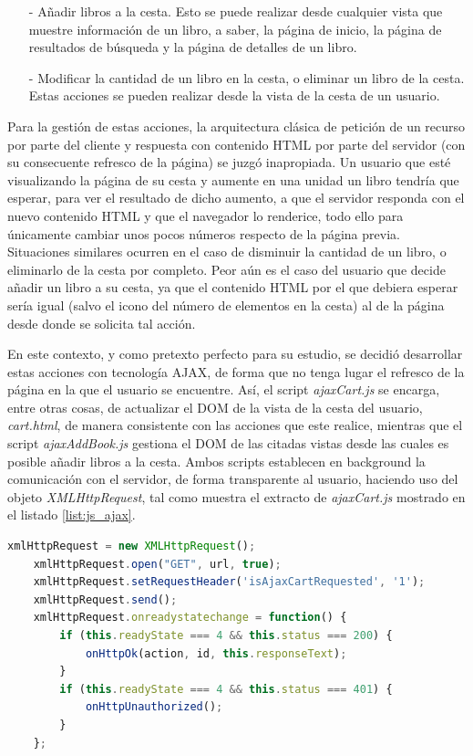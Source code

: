 \documentclass[a4paper,12pt,twoside,openright]{report}
\begin{document}
    \begin{itemize}
    	\item[-] Añadir libros a la cesta. Esto se puede realizar desde cualquier vista que muestre información de un libro, a saber, la página de inicio, la página de resultados de búsqueda y la página de detalles de un libro.
    	\item[-] Modificar la cantidad de un libro en la cesta, o eliminar un libro de la cesta. Estas acciones se pueden realizar desde la vista de la cesta de un usuario.
    \end{itemize}
    
    Para la gestión de estas acciones, la arquitectura clásica de petición de un recurso por parte del cliente y respuesta con contenido HTML por parte del servidor (con su consecuente refresco de la página) se juzgó inapropiada. Un usuario que esté visualizando la página de su cesta y aumente en una unidad un libro tendría que esperar, para ver el resultado de dicho aumento, a que el servidor responda con el nuevo contenido HTML y que el navegador lo renderice, todo ello para únicamente cambiar unos pocos números respecto de la página previa. Situaciones similares ocurren en el caso de disminuir la cantidad de un libro, o eliminarlo de la cesta por completo. Peor aún es el caso del usuario que decide añadir un libro a su cesta, ya que el contenido HTML por el que debiera esperar sería igual (salvo el icono del número de elementos en la cesta) al de la página desde donde se solicita tal acción.
    
    En este contexto, y como pretexto perfecto para su estudio, se decidió desarrollar estas acciones con tecnología AJAX, de forma que no tenga lugar el refresco de la página en la que el usuario se encuentre. Así, el script \emph{ajaxCart.js} se encarga, entre otras cosas, de actualizar el DOM de la vista de la cesta del usuario, \emph{cart.html}, de manera consistente con las acciones que este realice, mientras que el script \emph{ajaxAddBook.js} gestiona el DOM de las citadas vistas desde las cuales es posible añadir libros a la cesta. Ambos scripts establecen en background la comunicación con el servidor, de forma transparente al usuario, haciendo uso del objeto \emph{XMLHttpRequest}, tal como muestra el extracto de \emph{ajaxCart.js} mostrado en el listado \ref{list:js_ajax}.
    \\
    
    \begin{lstlisting}[language=JavaScript,caption=Comunicación Ajax con el servidor,label=list:js_ajax]
    xmlHttpRequest = new XMLHttpRequest();
    xmlHttpRequest.open("GET", url, true);
    xmlHttpRequest.setRequestHeader('isAjaxCartRequested', '1');
    xmlHttpRequest.send();
    xmlHttpRequest.onreadystatechange = function() {
    	if (this.readyState === 4 && this.status === 200) {
    		onHttpOk(action, id, this.responseText);
    	}
    	if (this.readyState === 4 && this.status === 401) {
    		onHttpUnauthorized();
    	}
    };
    \end{lstlisting}
    
\end{document}
